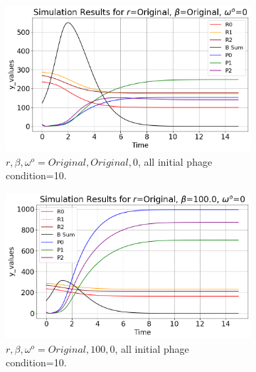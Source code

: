 \begin{figure}[]
    \centering
    \begin{subfigure}{0.32\linewidth}
        \centering
        \includegraphics[width=\linewidth]{Images/Plots/Created/UA/r_beta_washout_Original_Original_0.png}
        \caption{
            $r, \beta, \omega^o = Original, Original, 0$, all initial phage condition=10. 
        }
        \label{fig:created:r_beta_washout_original_original_0}
    \end{subfigure}
    \begin{subfigure}{0.32\linewidth}
        \centering
        \includegraphics[width=\linewidth]{Images/Plots/Created/UA/r_beta_washout_Original_100.0_0.png}
        \caption{
            $r, \beta, \omega^o = Original, 100, 0$, all initial phage condition=10. 
        }
        \label{fig:created:r_beta_washout_original_100_0}
    \end{subfigure}
    \begin{subfigure}{0.32\linewidth}
        \centering

\end{subfigure}
\end{figure}
